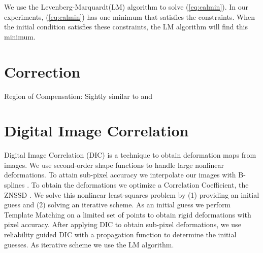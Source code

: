 \documentclass{svjour3}                     %
\begin{document}
We use the Levenberg-Marquardt(LM) algorithm to solve (\ref{eq:calmin}). In our experiments, (\ref{eq:calmin}) has one minimum that satisfies the constraints. When the initial condition satisfies these constraints, the LM algorithm will find this minimum.


\section{Correction}
\label{sec:cor}
Region of Compensation: Sightly similar to \cite{tian2018accuracy} and \cite{pan2013high}

\section{Digital Image Correlation}
\label{sec:DIC}
Digital Image Correlation (DIC) is a technique \cite{sutton2009image} to obtain deformation maps from images. We use second-order shape functions \cite{lu2000deformation} to handle large nonlinear deformations. To attain sub-pixel accuracy we interpolate our images with B-splines \cite{thevenaz2000interpolation, unser1999splines}. To obtain the deformations we optimize a Correlation Coefficient, the ZNSSD \cite{sutton2009image}. We solve this nonlinear least-squares problem  by (1) providing an initial guess and (2) solving an iterative scheme. As an initial guess we perform Template Matching \cite{lewis1995industrial,opencv_library} on a limited set of points to obtain rigid deformations with pixel accuracy. After applying DIC to obtain sub-pixel deformations, we use reliability guided DIC \cite{chen2009quality, pan2012incremental} with a propagation function \cite{zhou2012propagation} to determine the initial guesses. As iterative scheme we use the LM algorithm. 
\end{document}
